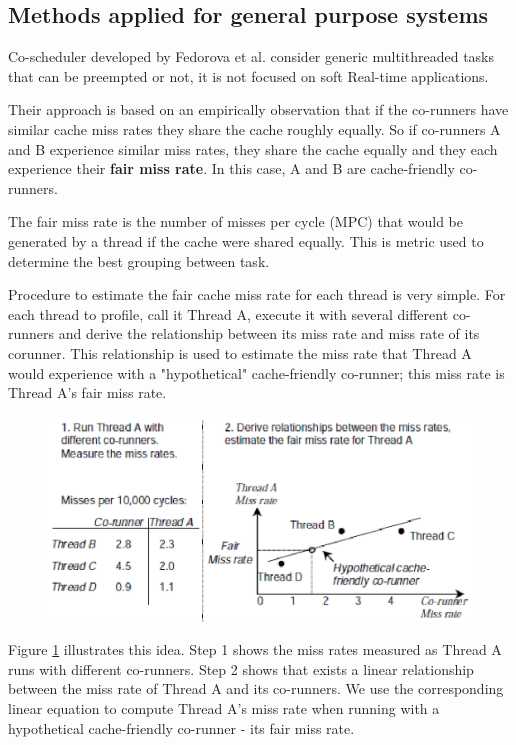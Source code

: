 \subsection{Methods applied for general purpose systems}

Co-scheduler developed by Fedorova et al. consider generic multithreaded tasks that can be preempted or not, it is not focused on soft Real-time 
applications. 

Their approach is based on an empirically observation that if the co-runners have similar cache miss rates they share the cache
roughly equally. So if co-runners A and B experience similar miss rates, they share the cache equally and they each experience their
\textbf{fair miss rate}. In this case, A and B are cache-friendly co-runners.

The fair miss rate is the number of misses per cycle (MPC) that would be generated by a thread if the cache were shared equally. This is metric used
to determine the best grouping between task.

Procedure to estimate the fair cache miss rate for each thread is very simple.
For each thread to profile, call it Thread A, execute it with several different co-runners and derive the relationship between its miss rate and 
miss rate of its corunner. This relationship is used to estimate the miss rate that Thread A would experience with a "hypothetical" 
cache-friendly co-runner; this miss rate is Thread A's fair miss rate. 

\newpage

\begin{figure}[htbp]
\centering
\includegraphics[width=\widefigure]{images/fedorova.eps}
\caption{}
\label{fig:fed}
\end{figure}

Figure \ref{fig:fed} illustrates this idea. Step 1 shows the miss rates measured as Thread A
runs with different co-runners. Step 2 shows that exists a linear relationship between the miss rate of Thread A and its co-runners.
We use the corresponding linear equation to compute Thread A's miss rate when running with a hypothetical cache-friendly co-runner - its fair miss 
rate.

